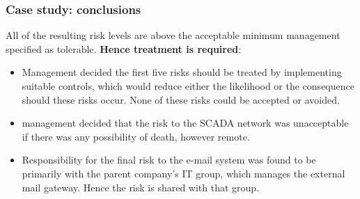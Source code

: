 \documentclass[xcolor ={table,usenames,dvipsnames}]{beamer}
\theoremstyle{definition}
\begin{document}
	\begin{frame}
		\frametitle{Case study: conclusions}
		All of the resulting risk levels are above the acceptable minimum management specified as tolerable. \textbf{Hence treatment is required}:
		\begin{itemize}
			\item Management decided the first five risks should be treated
			by implementing suitable controls, which would reduce either the likelihood or the consequence should these risks occur. None of these risks could be accepted or avoided.
			\item management decided that the risk to the SCADA network was
			unacceptable if there was any possibility of death, however remote. 
			\item Responsibility for the final risk	to the e-mail system was found to be primarily with the parent company’s IT group,
			which manages the external mail gateway. Hence the risk is shared with that group.
		\end{itemize}
	\end{frame}

	
	

	

	





	

	
\end{document}
